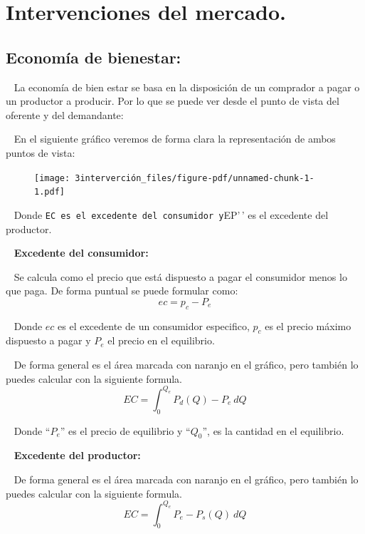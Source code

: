 \documentclass[
  letterpaper,
  DIV=11,
  numbers=noendperiod]{scrreport}
\begin{document}

\hypertarget{intervenciones-del-mercado.}{%
\chapter{Intervenciones del
mercado.}\label{intervenciones-del-mercado.}}

\hypertarget{economuxeda-de-bienestar}{%
\section{Economía de bienestar:}\label{economuxeda-de-bienestar}}

~ La economía de bien estar se basa en la disposición de un comprador a
pagar o un productor a producir. Por lo que se puede ver desde el punto
de vista del oferente y del demandante:

~ En el siguiente gráfico veremos de forma clara la representación de
ambos puntos de vista:

\begin{figure}

{\centering \texttt{[image: 3interverción\_files/figure-pdf/unnamed-chunk-1-1.pdf]}

}

\end{figure}

~ Donde
\texttt{EC\textquotesingle{}\textquotesingle{}\ es\ el\ excedente\ del\ consumidor\ y}EP'\,'
es el excedente del productor.

~ \textbf{Excedente del consumidor:}

~ Se calcula como el precio que está dispuesto a pagar el consumidor
menos lo que paga. De forma puntual se puede formular como: \[
ec = p_c - P_e
\]

~ Donde \(ec\) es el excedente de un consumidor especifico, \(p_c\) es
el precio máximo dispuesto a pagar y \(P_e\) el precio en el equilibrio.

~ De forma general es el área marcada con naranjo en el gráfico, pero
también lo puedes calcular con la siguiente formula. \[
EC = \int_{0}^{Q_e}{P_d(Q)-P_e \ dQ}
\]

~ Donde ``\(P_e\)'' es el precio de equilibrio y ``\(Q_0\)'', es la
cantidad en el equilibrio.

~ \textbf{Excedente del productor:}

~ De forma general es el área marcada con naranjo en el gráfico, pero
también lo puedes calcular con la siguiente formula. \[
EC = \int_{0}^{Q_e}{P_e-P_s(Q) \ dQ}
\]
\end{document}
